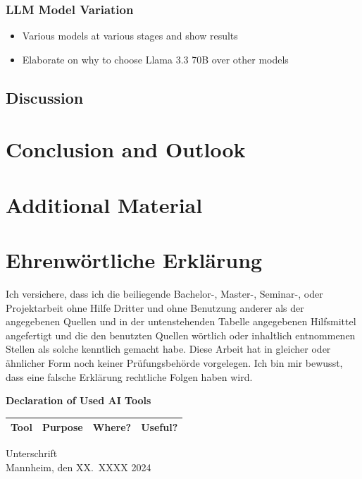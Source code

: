 \documentclass[a4paper,oneside,bibliography=totoc]{scrbook}
\begin{document}
\subsection{LLM Model Variation}
\label{subsec:llm_model_variation}
\begin{itemize}
  \item Various models at various stages and show results
  \item Elaborate on why to choose Llama 3.3 70B over other models
\end{itemize}

\section{Discussion}
\label{sec:discussion}


\chapter{Conclusion and Outlook}
\label{ch:conclusion_outlook}




\appendix
\chapter{Additional Material}
\label{ch:additional_material}


\backmatter
\chapter{Ehrenwörtliche Erklärung}
\label{ch:declaration}

Ich versichere, dass ich die beiliegende Bachelor-, Master-, Seminar-, oder
Projektarbeit ohne Hilfe Dritter und ohne Benutzung anderer als der angegebenen
Quellen und in der untenstehenden Tabelle angegebenen Hilfsmittel angefertigt
und die den benutzten Quellen wörtlich oder inhaltlich entnommenen Stellen als
solche kenntlich gemacht habe. Diese Arbeit hat in gleicher oder ähnlicher Form
noch keiner Prüfungsbehörde vorgelegen. Ich bin mir bewusst, dass eine falsche
Erklärung rechtliche Folgen haben wird.

\begin{center}
  \textbf{Declaration of Used AI Tools} \\[.3em]
  \begin{tabularx}{\textwidth}{lXlc}
    \toprule
    Tool & Purpose & Where? & Useful? \\
    \midrule
    \bottomrule
  \end{tabularx}
\end{center}

\vspace{2cm}
\noindent Unterschrift\\
\noindent Mannheim, den XX.~XXXX 2024 \hfill
\end{document}
